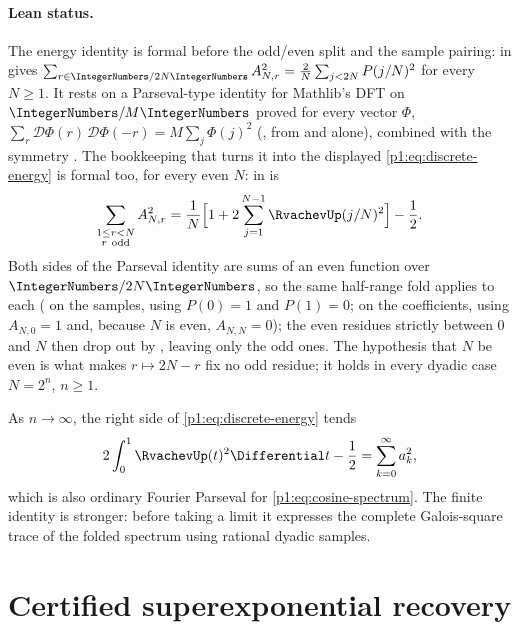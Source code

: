 \documentclass[11pt,oneside]{article}
\theoremstyle{definition}
\theoremstyle{remark}
\begin{document}
\paragraph{Lean status.}
The energy identity is formal before the odd/even split and the sample pairing:
 in  gives
\(\sum_{r\in\IntegerNumbers/2N\IntegerNumbers}A_{N,r}^2=\tfrac2N\sum_{j<2N}P(j/N)^2\)
for every \(N\ge1\).  It rests on a Parseval-type identity for Mathlib's DFT on
\(\IntegerNumbers/M\IntegerNumbers\) proved for every vector \(\Phi\),
\(\sum_r\mathcal D\Phi(r)\,\mathcal D\Phi(-r)=M\sum_j\Phi(j)^2\)
(, from  and  alone),
combined with the symmetry .  The bookkeeping that turns it
into the displayed \eqref{p1:eq:discrete-energy} is formal too, for every even \(N\):
 in  is
\[
  \sum_{\substack{1\le r<N\\ r\ \mathrm{odd}}}A_{N,r}^2
  =\frac1N\Bigl[1+2\sum_{j=1}^{N-1}\RvachevUp(j/N)^2\Bigr]-\frac12 .
\]
Both sides of the Parseval identity are sums of an even function over
\(\IntegerNumbers/2N\IntegerNumbers\), so the same half-range fold applies to each
( on the samples, using \(P(0)=1\) and \(P(1)=0\);
 on the coefficients, using \(A_{N,0}=1\) and,
because \(N\) is even, \(A_{N,N}=0\)); the even residues strictly between \(0\) and \(N\) then
drop out by , leaving only the odd ones.  The
hypothesis that \(N\) be even is what makes \(r\mapsto2N-r\) fix no odd residue; it holds in
every dyadic case \(N=2^n\), \(n\ge1\).

\begin{remark}
As $n\to\infty$, the right side of \eqref{p1:eq:discrete-energy} tends
\[
 2\int_0^1\RvachevUp(t)^2\Differential t-\frac12
 =\sum_{k=0}^{\infty}a_k^2,
\]
which is also ordinary Fourier Parseval for \eqref{p1:eq:cosine-spectrum}.  The
finite identity is stronger: before taking a limit it expresses the complete
Galois-square trace of the folded spectrum using rational dyadic samples.
\end{remark}

\section{Certified superexponential recovery}\label{p1:sec:alias-error}
\end{document}
